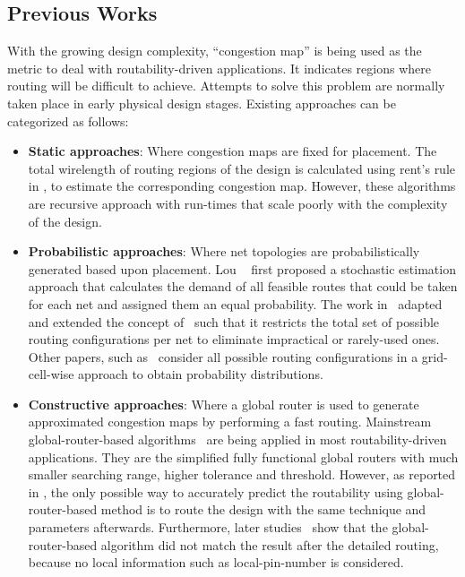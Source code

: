 \subsection{Previous Works}
With the growing design complexity, ``congestion map'' is being used as the metric to deal with routability-driven applications.
It indicates regions where routing will be difficult to achieve.
Attempts to solve this problem are normally taken place in early physical design stages.
Existing approaches can be categorized as follows:
\begin{itemize}
\item \textbf{Static approaches}: Where congestion maps are fixed for placement. The total wirelength of routing regions of the design is calculated using rent's rule in \cite{rentsrule,rentsrulerecursive}, to estimate the corresponding congestion map. However, these algorithms are recursive approach with run-times that scale poorly with the complexity of the design. 
\item \textbf{Probabilistic approaches}: Where net topologies are probabilistically generated based upon placement.  Lou \etal~\cite{first} first proposed a stochastic estimation approach that calculates the demand of all feasible routes that could be taken for each net and assigned them an equal probability. The work in~\cite{modeling} adapted and extended the concept of~\cite{first} such that it restricts the total set of possible routing configurations per net to eliminate impractical or rarely-used ones. Other papers, such as~\cite{SMD, 3step} consider all possible routing configurations in a grid-cell-wise approach to obtain probability distributions.
\item \textbf{Constructive approaches}: Where a global router is used to generate approximated congestion maps by performing a fast routing.  Mainstream global-router-based algorithms~\cite{mixedsizeplacement,ripple,simplr,nctufast,fastroute} are being applied in most routability-driven applications. They are the simplified fully functional global routers with much smaller searching range, higher tolerance and threshold. However, as reported in \cite{fastroute}, the only possible way to accurately predict the routability using global-router-based method is to route the design with the same technique and parameters afterwards. Furthermore, later studies~\cite{study,ispd14,ispd15} show that the global-router-based algorithm did not match the result after the detailed routing, because no local information such as local-pin-number is considered.

\end{itemize}
